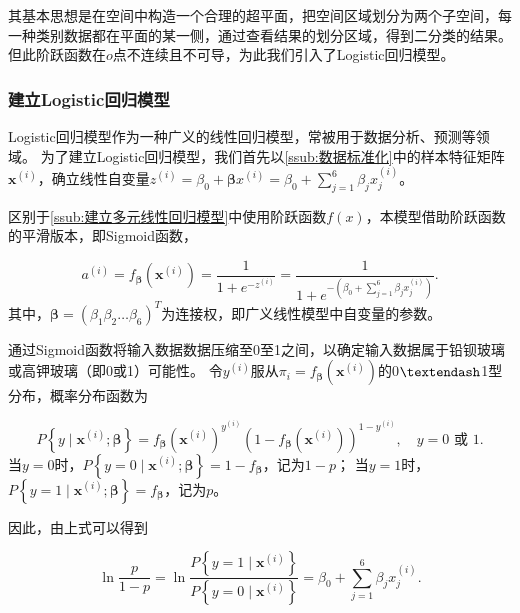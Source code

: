 其基本思想是在空间中构造一个合理的超平面，把空间区域划分为两个子空间，每一种类别数据都在平面的某一侧，通过查看结果的划分区域，得到二分类的结果。
但此阶跃函数在$o$点不连续且不可导，为此我们引入了Logistic回归模型。



\subsubsection{建立Logistic回归模型} %
\label{ssub:建立logistic回归模型}

Logistic回归模型作为一种广义的线性回归模型，常被用于数据分析、预测等领域。
为了建立Logistic回归模型，我们首先以\ref{ssub:数据标准化}中的样本特征矩阵$\boldsymbol{x}^{(i)}$，确立线性自变量$z^{(i)}=\beta_0+\boldsymbol{\beta}x^{(i)}=\beta_0+\sum^6_{j=1}\beta_jx^{(i)}_j$。

区别于\ref{ssub:建立多元线性回归模型}中使用阶跃函数$f(x)$，本模型借助阶跃函数的平滑版本，即Sigmoid函数，

\begin{equation}
	a^{(i)}=f_{\boldsymbol{\beta}}\left(\boldsymbol{x}^{(i)}\right)=\frac{1}{1+e^{-z^{(i)}}}=\frac{1}{1+e^{-\left(\beta_{0}+\sum_{j=1}^{6} \beta_{j} x_{j}^{(i)}\right)}}.
\end{equation}
其中，$\boldsymbol{\beta}=(\beta_1 \beta_2\dots \beta_6)^T$为连接权，即广义线性模型中自变量的参数。

通过Sigmoid函数将输入数据数据压缩至0至1之间，以确定输入数据属于铅钡玻璃或高钾玻璃（即0或1）可能性。
令$y^{(i)}$服从$\pi_{i}=f_{\boldsymbol{\beta}}\left(\boldsymbol{x}^{(i)}\right)$的0$\textendash$1型分布，概率分布函数为

\begin{equation}
	P\left\{y \mid \boldsymbol{x}^{(i)} ; \boldsymbol{\beta}\right\}=f_{\boldsymbol{\beta}}\left(\boldsymbol{x}^{(i)}\right)^{y^{(i)}}\left(1-f_{\boldsymbol{\beta}}\left(\boldsymbol{x}^{(i)}\right)\right)^{1-y^{(i)}},\quad y=0 \text { 或 } 1.
\end{equation}
当$y=0$时，$P\left\{y=0 \mid \boldsymbol{x}^{(i)} ; \boldsymbol{\beta}\right\}=1-f_{\boldsymbol{\beta}}$，记为$1-p$；
当$y=1$时，$P\left\{y=1 \mid \boldsymbol{x}^{(i)} ; \boldsymbol{\beta}\right\}=f_{\boldsymbol{\beta}}$，记为$p$。

因此，由上式可以得到

\begin{equation}
	\ln \frac{p}{1-p}=\ln \frac{P\left\{y=1 \mid \boldsymbol{x}^{(i)}\right\}}{P\left\{y=0 \mid \boldsymbol{x}^{(i)}\right\}}=\beta_{0}+\sum_{j=1}^{6} \beta_{j} x_{j}^{(i)}.
\end{equation}

